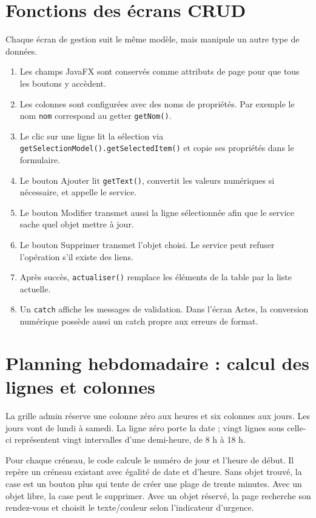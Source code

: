 \documentclass[11pt,a4paper]{report}
\begin{document}
\section{Fonctions des écrans CRUD}
Chaque écran de gestion suit le même modèle, mais manipule un autre type de données.
\begin{enumerate}
\item Les champs JavaFX sont conservés comme attributs de page pour que tous les boutons y accèdent.
\item Les colonnes sont configurées avec des noms de propriétés. Par exemple le nom \texttt{nom} correspond au getter \texttt{getNom()}.
\item Le clic sur une ligne lit la sélection via \texttt{getSelectionModel().getSelectedItem()} et copie ses propriétés dans le formulaire.
\item Le bouton Ajouter lit \texttt{getText()}, convertit les valeurs numériques si nécessaire, et appelle le service.
\item Le bouton Modifier transmet aussi la ligne sélectionnée afin que le service sache quel objet mettre à jour.
\item Le bouton Supprimer transmet l'objet choisi. Le service peut refuser l'opération s'il existe des liens.
\item Après succès, \texttt{actualiser()} remplace les éléments de la table par la liste actuelle.
\item Un \texttt{catch} affiche les messages de validation. Dans l'écran Actes, la conversion numérique possède aussi un catch propre aux erreurs de format.
\end{enumerate}

\section{Planning hebdomadaire : calcul des lignes et colonnes}
La grille admin réserve une colonne zéro aux heures et six colonnes aux jours. Les jours vont de lundi à samedi. La ligne zéro porte la date ; vingt lignes sous celle-ci représentent vingt intervalles d'une demi-heure, de 8 h à 18 h.

Pour chaque créneau, le code calcule le numéro de jour et l'heure de début. Il repère un créneau existant avec égalité de date et d'heure. Sans objet trouvé, la case est un bouton plus qui tente de créer une plage de trente minutes. Avec un objet libre, la case peut le supprimer. Avec un objet réservé, la page recherche son rendez-vous et choisit le texte/couleur selon l'indicateur d'urgence.
\end{document}
